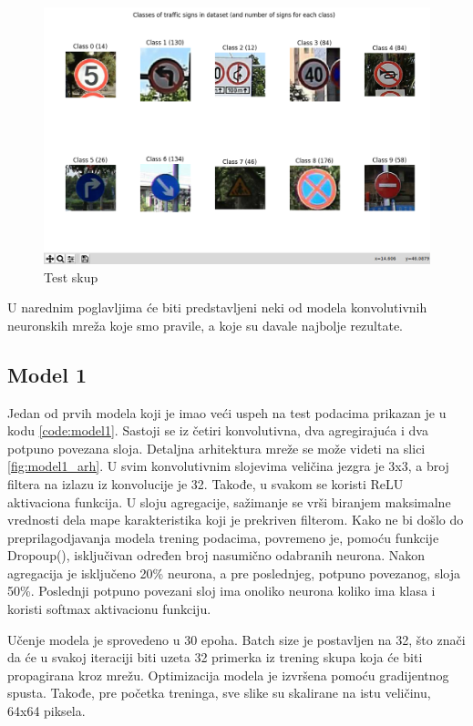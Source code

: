 \documentclass[a4paper]{article}
\begin{document}
\begin{figure}[h!]
\begin{center}
\includegraphics[scale=0.25]{test_skup.png}
\end{center}
\caption{Test skup}
\label{fig:test_skup}
\end{figure}

U narednim poglavljima će biti predstavljeni neki od modela konvolutivnih neuronskih mreža koje smo pravile, a koje su davale najbolje rezultate.

\subsection{Model 1}
\label{sec:model_1}

Jedan od prvih modela koji je imao veći uspeh na test podacima prikazan je u kodu \ref{code:model1}. Sastoji se iz četiri konvolutivna, dva agregirajuća i dva potpuno povezana sloja. Detaljna arhitektura mreže se može videti na slici \ref{fig:model1_arh}. U svim konvolutivnim slojevima veličina jezgra je 3x3, a broj filtera na izlazu iz konvolucije je 32. Takođe, u svakom se koristi ReLU aktivaciona funkcija. U sloju agregacije, sažimanje se vrši biranjem maksimalne vrednosti dela mape karakteristika koji je prekriven filterom. Kako ne bi došlo do preprilagodjavanja modela trening podacima, povremeno je, pomoću funkcije Dropoup(), isključivan određen broj nasumično odabranih neurona. Nakon agregacija je isključeno 20\% neurona, a pre poslednjeg, potpuno povezanog, sloja 50\%. Poslednji potpuno povezani sloj ima onoliko neurona koliko ima klasa i koristi softmax aktivacionu funkciju.

Učenje modela je sprovedeno u 30 epoha. Batch size je postavljen na 32, što znači da će u svakoj iteraciji biti uzeta 32 primerka iz trening skupa koja će biti propagirana kroz mrežu. Optimizacija modela je izvršena pomoću gradijentnog spusta. Takođe, pre početka treninga, sve slike su skalirane na istu veličinu, 64x64 piksela.
\end{document}
